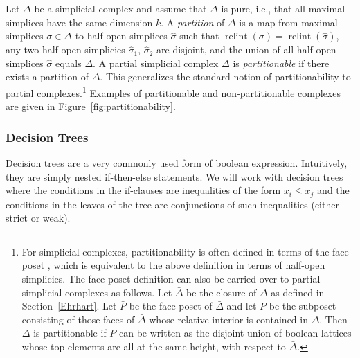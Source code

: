 \documentclass[12pt,reqno]{amsart}
\numberwithin{definition}{section}
\theoremstyle{definition}
\newcommand{\relint}{\operatorname{relint}}
\begin{document}
Let $\Delta$ be a simplicial complex and assume that $\Delta$ is pure, i.e., that all maximal simplices have the same dimension $k$. A \emph{partition} of $\Delta$ is a map from maximal simplices $\sigma\in\Delta$ to half-open simplices $\hat{\sigma}$ such that $\relint(\sigma)=\relint(\hat{\sigma})$, any two half-open simplicies $\hat{\sigma}_1$, $\hat{\sigma}_2$ are disjoint, and the union of all half-open simplices $\hat{\sigma}$ equals $\Delta$. A partial simplicial complex $\Delta$ is \emph{partitionable} if there exists a partition of $\Delta$. This generalizes the standard notion of partitionability to partial complexes.\footnote{For simplicial complexes, partitionability is often defined in terms of the face poset \cite{Lee2004,Ziegler1995}, which is equivalent to the above definition in terms of half-open simplicies. The face-poset-definition can also be carried over to partial simplicial complexes as follows. Let $\bar{\Delta}$ be the closure of $\Delta$ as defined in Section~\ref{Ehrhart}. Let $\bar{P}$ be the face poset of $\bar{\Delta}$ and let $P$ be the subposet consisting of those faces of $\bar{\Delta}$ whose relative interior is contained in $\Delta$. Then $\Delta$ is partitionable if $P$ can be written as the disjoint union of boolean lattices whose top elements are all at the same height, with respect to $\bar{\Delta}$.} Examples of partitionable and non-partitionable complexes are given in Figure~\ref{fig:partitionability}.

\subsubsection{Decision Trees} Decision trees are a very commonly used form of boolean expression. Intuitively, they are simply nested if-then-else statements. We will work with decision trees where the conditions in the if-clauses are inequalities of the form $x_i \leq x_j$ and the conditions in the leaves of the tree are conjunctions of such inequalities (either strict or weak).
\end{document}
